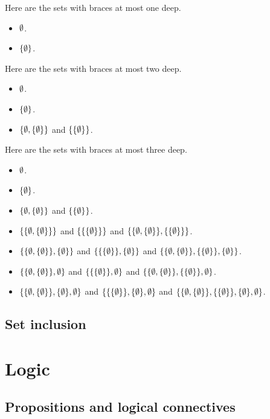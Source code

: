 \documentclass{report}
\begin{document}
\begin{solution}
Here are the sets with braces at most one deep.
\begin{itemize}
    \item $\emptyset$.
    \item $\left\{\emptyset\right\}$.
\end{itemize}

Here are the sets with braces at most two deep.
\begin{itemize}
    \item $\emptyset$.
    \item $\left\{\emptyset\right\}$.
    \item $\left\{\emptyset, \left\{\emptyset\right\}\right\}$ and $\left\{\left\{\emptyset\right\}\right\}$.
\end{itemize}

Here are the sets with braces at most three deep.
\begin{itemize}
    \item $\emptyset$.
    \item $\left\{\emptyset\right\}$.
    \item $\left\{\emptyset, \left\{\emptyset\right\}\right\}$ and $\left\{\left\{\emptyset\right\}\right\}$.
    \item $\left\{\left\{\emptyset, \left\{\emptyset\right\}\right\}\right\}$ and $\left\{\left\{\left\{\emptyset\right\}\right\}\right\}$ and
    $\set{\set{\eset, \set{\eset}}, \set{\set{\eset}}}$.
    \item $\set{\set{\eset, \set{\eset}}, \set{\eset}}$ and $\set{\set{\set{\eset}}, \set{\eset}}$ and
    $\set{\set{\eset, \set{\eset}}, \set{\set{\eset}}, \set{\eset}}$.
    \item $\set{\set{\eset, \set{\eset}}, \eset}$ and $\set{\set{\set{\eset}}, \eset}$ and
    $\set{\set{\eset, \set{\eset}}, \set{\set{\eset}}, \eset}$.
    \item $\set{\set{\eset, \set{\eset}}, \set{\eset}, \eset}$ and $\set{\set{\set{\eset}}, \set{\eset}, \eset}$ and
    $\set{\set{\eset, \set{\eset}}, \set{\set{\eset}}, \set{\eset}, \eset}$.
\end{itemize}

\end{solution}
\section{Set inclusion}


\chapter{Logic}
\section{Propositions and logical connectives}
\end{document}
